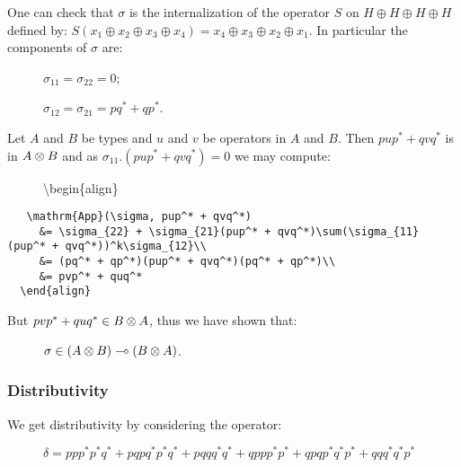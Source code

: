 One can check that \(\sigma\) is the internalization of the operator
\(S\) on \(H\oplus H\oplus H\oplus H\) defined by:
\(S(x_1\oplus x_2\oplus x_3\oplus x_4) = x_4\oplus x_3\oplus x_2\oplus x_1\).
In particular the components of \(\sigma\) are:

\begin{description}
\item[]
\(\sigma_{11} = \sigma_{22} = 0\);

\(\sigma_{12} = \sigma_{21} = pq^* + qp^*\).
\end{description}

Let \(A\) and \(B\) be types and \(u\) and \(v\) be operators in \(A\)
and \(B\). Then \(pup^* + qvq^*\) is in \(A\otimes B\) and as
\(\sigma_{11}.(pup^* + qvq^*) = 0\) we may compute:

\begin{description}
\item[]
\textbackslash{}begin\{align\}
\end{description}

\texttt{~~~\textbackslash{}mathrm\{App\}(\textbackslash{}sigma,~pup\^{}*~+~qvq\^{}*)~}\\
\texttt{~~~~~\&=~\textbackslash{}sigma\_\{22\}~+~\textbackslash{}sigma\_\{21\}(pup\^{}*~+~qvq\^{}*)\textbackslash{}sum(\textbackslash{}sigma\_\{11\}(pup\^{}*~+~qvq\^{}*))\^{}k\textbackslash{}sigma\_\{12\}\textbackslash{}\textbackslash{}}\\
\texttt{~~~~~\&=~(pq\^{}*~+~qp\^{}*)(pup\^{}*~+~qvq\^{}*)(pq\^{}*~+~qp\^{}*)\textbackslash{}\textbackslash{}}\\
\texttt{~~~~~\&=~pvp\^{}*~+~quq\^{}*}\\
\texttt{~~\textbackslash{}end\{align\}}

But \(pvp^* + quq^*\in B\otimes A\), thus we have shown that:

\begin{description}
\item[]
\(\sigma\in (A\otimes B) \multimap (B\otimes A)\).
\end{description}

\subsubsection{Distributivity}\label{distributivity}

We get distributivity by considering the operator:

\begin{description}
\item[]
\(\delta = ppp^*p^*q^* + pqpq^*p^*q^* + pqqq^*q^* + qppp^*p^* + qpqp^*q^*p^* + qqq^*q^*p^*\)
\end{description}

